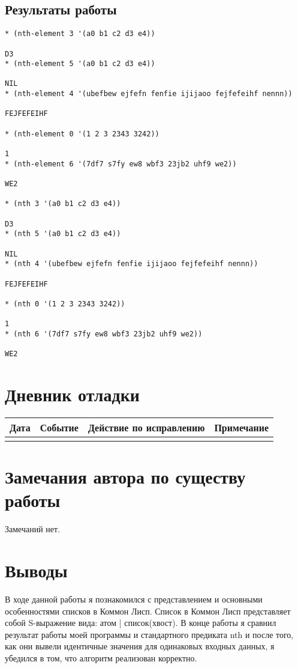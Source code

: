 \documentclass[12pt]{article}
\begin{document}
\subsection{Результаты работы}
\begin{verbatim}
* (nth-element 3 '(a0 b1 c2 d3 e4))

D3
* (nth-element 5 '(a0 b1 c2 d3 e4)) 

NIL
* (nth-element 4 '(ubefbew ejfefn fenfie ijijaoo fejfefeihf nennn))

FEJFEFEIHF

* (nth-element 0 '(1 2 3 2343 3242))

1
* (nth-element 6 '(7df7 s7fy ew8 wbf3 23jb2 uhf9 we2))

WE2

* (nth 3 '(a0 b1 c2 d3 e4))

D3
* (nth 5 '(a0 b1 c2 d3 e4))

NIL
* (nth 4 '(ubefbew ejfefn fenfie ijijaoo fejfefeihf nennn))

FEJFEFEIHF

* (nth 0 '(1 2 3 2343 3242))

1
* (nth 6 '(7df7 s7fy ew8 wbf3 23jb2 uhf9 we2))

WE2
\end{verbatim}

\section{Дневник отладки}
\begin{tabular}{|p{50pt}|p{130pt}|p{130pt}|p{70pt}|}
\hline
Дата & Событие & Действие по исправлению & Примечание \\ \hline
& & &\\
\hline
\end{tabular}

\section{Замечания автора по существу работы}
Замечаний нет.

\section{Выводы}
В ходе данной работы я познакомился с представлением и основными особенностями списков в Коммон Лисп. Список в Коммон Лисп представляет собой S-выражение вида: атом | список(хвост). В конце работы я сравнил результат работы моей программы и стандартного предиката nth и после того, как они вывели идентичные значения для одинаковых входных данных, я убедился в том, что алгоритм реализован корректно.
\end{document}

